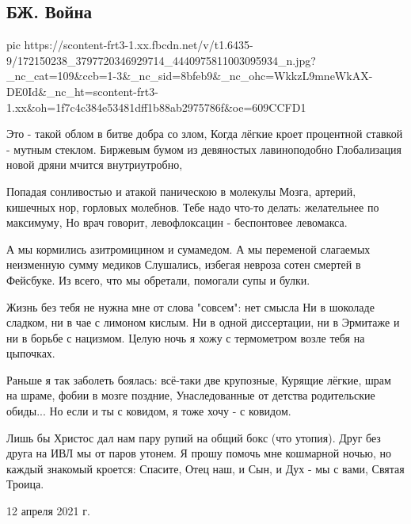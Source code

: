  
 
 
 
 

\subsection{БЖ. Война}

\ifcmt
  pic https://scontent-frt3-1.xx.fbcdn.net/v/t1.6435-9/172150238_3797720346929714_4440975811003095934_n.jpg?_nc_cat=109&ccb=1-3&_nc_sid=8bfeb9&_nc_ohc=WkkzL9mneWkAX-DE0Id&_nc_ht=scontent-frt3-1.xx&oh=1f7c4c384e53481dff1b88ab2975786f&oe=609CCFD1
\fi

Это - такой облом в битве добра со злом,
Когда лёгкие кроет процентной ставкой - мутным стеклом.
Биржевым бумом из девяностых лавиноподобно
Глобализация новой дряни мчится внутриутробно,

Попадая сонливостью и атакой паническою в молекулы
Мозга, артерий, кишечных нор, горловых молебнов.
Тебе надо что-то делать: желательнее по максимуму,
Но врач говорит, левофлоксацин - беспонтовее левомакса.

А мы кормились азитромицином и сумамедом.
А мы переменой слагаемых неизменную сумму медиков
Слушались, избегая невроза сотен смертей в Фейсбуке.
Из всего, что мы обретали, помогали супы и булки.

Жизнь без тебя не нужна мне от слова "совсем": нет смысла
Ни в шоколаде сладком, ни в чае с лимоном кислым.
Ни в одной диссертации, ни в Эрмитаже и ни в борьбе с нацизмом.
Целую ночь я хожу с термометром возле тебя на цыпочках.

Раньше я так заболеть боялась: всё-таки две крупозные,
Курящие лёгкие, шрам на шраме, фобии в мозге поздние,
Унаследованные от детства родительские обиды...
Но если и ты с ковидом, я тоже хочу - с ковидом.

Лишь бы Христос дал нам пару рупий на общий бокс (что утопия).
Друг без друга на ИВЛ мы от паров утонем.
Я прошу помочь мне кошмарной ночью, но каждый знакомый кроется:
Спасите, Отец наш, и Сын, и Дух - мы с вами, Святая Троица. 

12 апреля 2021 г.
